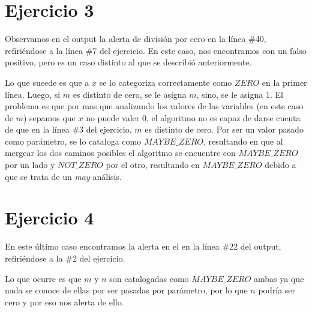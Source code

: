 \section*{Ejercicio 3}
\setcounter{section}{3}

Observamos en el output la alerta de división por cero en la línea \#40, refiriéndose a la línea \#7 del ejercicio. En este caso, nos encontramos con un falso positivo, pero es un caso distinto al que se describió anteriormente.

Lo que sucede es que a $x$ se lo categoriza correctamente como $ZERO$ en la primer línea. Luego, si $m$ es distinto de cero, se le asigna $m$, sino, se le asigna 1. El problema es que por mas que analizando los valores de las variables (en este caso de $m$) sepamos que $x$ no puede valer 0, el algoritmo no es capaz de darse cuenta de que en la línea \#3 del ejercicio, $m$ es distinto de cero. Por ser un valor pasado como parámetro, se lo cataloga como $MAYBE\_ZERO$, resultando en que al mergear los dos caminos posibles el algoritmo se encuentre con $MAYBE\_ZERO$ por un lado y $NOT\_ZERO$ por el otro, resultando en $MAYBE\_ZERO$ debido a que se trata de un \textit{may} análisis.

\section*{Ejercicio 4}
\setcounter{section}{4}

En este último caso encontramos la alerta en el en la línea \#22 del output, refiriéndose a la \#2 del ejercicio. 

Lo que ocurre es que $m$ y $n$ son catalogadas como $MAYBE\_ZERO$ ambas ya que nada se conoce de ellas por ser pasadas por parámetro, por lo que $n$ podría ser cero y por eso nos alerta de ello.
